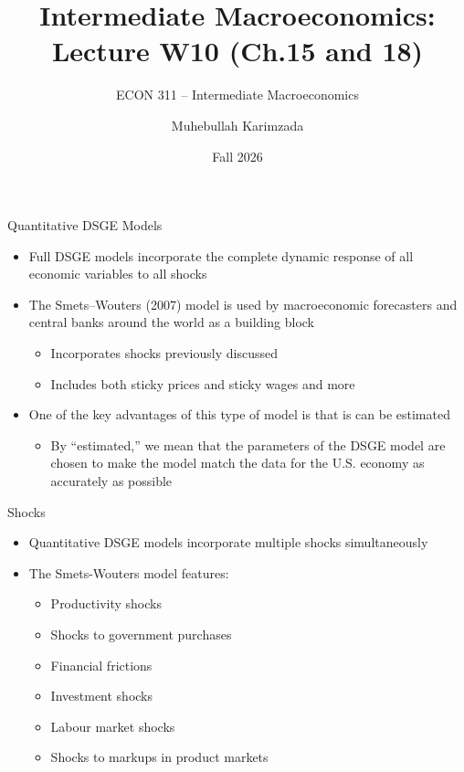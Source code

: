 \documentclass[aspectratio=1610]{beamer}
\title[Winter - Lecture 10] %
{Intermediate Macroeconomics: Lecture  W10 (Ch.15 and 18)}
\subtitle{ECON 311 -- Intermediate Macroeconomics}
\author{Muhebullah Karimzada}
\institute{School of Economics \\\ University of Northern British Columbia}
\date{Fall 2026}
\begin{document}
\begin{frame}[plain]
  \titlepage
\end{frame}

\begin{frame}[wide]{Quantitative DSGE Models}
	\begin{itemize}
		\item Full DSGE models incorporate the complete dynamic response of all economic variables to all shocks
		\item The Smets–Wouters (2007) model is used by macroeconomic forecasters and central banks around the world as a building block 
		\begin{itemize}
			\item Incorporates shocks previously discussed 
			\item Includes both sticky prices and sticky wages and more
		\end{itemize}
		
		\item One of the key advantages of this type of model is that is can be estimated
		\begin{itemize}
			\item By “estimated,” we mean that the parameters of the DSGE model are chosen to make the model match the data for the U.S. economy as accurately as possible
		\end{itemize}
	\end{itemize}
\end{frame}

\begin{frame}[wide]{Shocks}
	\begin{itemize}
		\item Quantitative DSGE models incorporate multiple shocks simultaneously
		\item The Smets-Wouters model features:
		\begin{itemize}
			\item Productivity shocks
			\item Shocks to government purchases
			\item Financial frictions
			\item Investment shocks
			\item Labour market shocks
			\item Shocks to markups in product markets
		\end{itemize}
		
	\end{itemize}
\end{frame}
\end{document}
